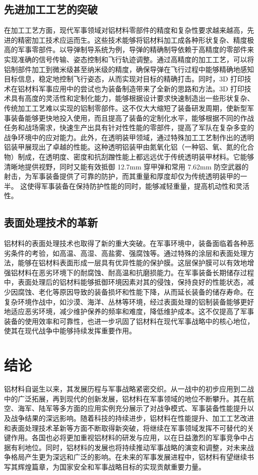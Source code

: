 \documentclass{source/Paper}
\begin{document}
\subsection{先进加工工艺的突破}
在加工工艺方面，现代军事领域对铝材料零部件的精度和复杂性要求越来越高，先进的精密加工技术应运而生。这些技术能够将铝材料加工成各种形状复杂、精度极高的军事零部件。以导弹制导系统为例，导弹的精确制导依赖于高精度的零部件来实现准确的信号传输、姿态控制和飞行轨迹调整。通过高精度的加工工艺，可以将铝制部件加工到微米级甚至纳米级的精度，确保导弹在飞行过程中能够精确地感知目标信息，稳定地控制飞行姿态，从而实现对目标的精确打击。同时，3D 打印技术在铝材料军事应用中的尝试也为装备制造带来了全新的思路和方法。3D 打印技术具有高度的灵活性和定制化能力，能够根据设计要求快速制造出一些形状复杂、传统加工工艺难以实现的铝制零部件。这不仅大大缩短了装备研发周期，使新型军事装备能够更快地投入使用，而且提高了装备的定制化水平，能够根据不同的作战任务和战场需求，快速生产出具有针对性性能的零部件，提高了军队在复杂多变的战争环境中的应对能力。此外，在透明装甲领域，通过特殊加工工艺制作出的透明铝装甲展现出了卓越的性能。这种透明铝装甲由氮氧化铝（一种铝、氧、氮的化合物）制成，在透明度、密度和抗刮蹭性能上都远远优于传统透明装甲材料。它能够清晰地提供视野，同时又能有效抵御 12.7mm 穿甲弹和常用 7.62mm 防空武器的射击，为军事装备提供了可靠的防护，而其重量和厚度却仅为传统透明装甲的一半。
\cite{guard}这使得军事装备在保持防护性能的同时，能够减轻重量，提高机动性和灵活性。
\subsection{表面处理技术的革新}
铝材料的表面处理技术也取得了新的重大突破。在军事环境中，装备面临着各种恶劣条件的考验，如高温、高湿、高盐雾、强腐蚀等。通过特殊的涂层和表面处理方法，能够在铝材料表面形成一层具有优异性能的保护膜。这层保护膜可以有效地增强铝材料在恶劣环境下的耐腐蚀、耐高温和抗磨损能力。在军事装备长期储存过程中，表面处理后的铝材料能够抵御环境因素对其的侵蚀，保持良好的性能状态，减少因腐蚀、老化等原因导致的装备损坏和性能下降，从而延长装备的储存寿命。在复杂环境作战中，如沙漠、海洋、丛林等环境，经过表面处理的铝制装备能够更好地适应恶劣环境，减少维护保养的频率和难度，降低维护成本。这不仅提高了军事装备的使用效率和可靠性，也进一步巩固了铝材料在现代军事战略中的核心地位，使其在现代战争中能够持续发挥重要作用。
\section{结论}
铝材料自诞生以来，其发展历程与军事战略紧密交织。从一战中的初步应用到二战中的广泛拓展，再到现代的创新发展，铝材料在军事领域的地位不断攀升。其在航空、海军、陆军等多方面的应用实例充分展示了对战争模式、军事装备性能提升以及战争结果的深远影响。随着科技的持续进步，铝材料在性能提升、加工工艺改进和表面处理技术革新等方面不断取得新突破，将继续在军事领域发挥不可替代的关键作用。各国也必将更加重视铝材料的研发与应用，以在日益激烈的军事竞争中占据有利地位。同时，铝材料的发展也将持续推动军事战略的演变和调整，对未来战争格局产生更为深远和广泛的影响。在未来的军事发展进程中，铝材料有望继续书写其辉煌篇章，为国家安全和军事战略目标的实现贡献重要力量。
\end{document}
